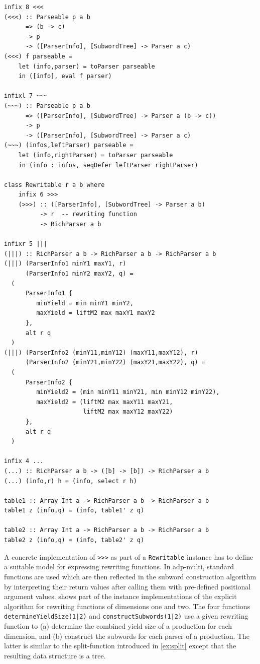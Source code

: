 \documentclass[
    a4paper,
    12pt,
    twoside,
    BCOR=12mm,
    parskip=half,
    chapterprefix,
    numbers=noenddot,
    bibliography=totoc
]{scrbook}
\begin{document}
\begin{lstlisting}[label=lst:combinators,caption=Rich combinators]
infix 8 <<<
(<<<) :: Parseable p a b 
      => (b -> c)
      -> p
      -> ([ParserInfo], [SubwordTree] -> Parser a c)
(<<<) f parseable =
    let (info,parser) = toParser parseable
    in ([info], eval f parser)
    
infixl 7 ~~~
(~~~) :: Parseable p a b 
      => ([ParserInfo], [SubwordTree] -> Parser a (b -> c))
      -> p
      -> ([ParserInfo], [SubwordTree] -> Parser a c)
(~~~) (infos,leftParser) parseable =
    let (info,rightParser) = toParser parseable
    in (info : infos, seqDefer leftParser rightParser)
    
class Rewritable r a b where
    infix 6 >>>
    (>>>) :: ([ParserInfo], [SubwordTree] -> Parser a b) 
          -> r  -- rewriting function
          -> RichParser a b
        
infixr 5 ||| 
(|||) :: RichParser a b -> RichParser a b -> RichParser a b
(|||) (ParserInfo1 minY1 maxY1, r) 
      (ParserInfo1 minY2 maxY2, q) =
  (
      ParserInfo1 {
         minYield = min minY1 minY2,
         maxYield = liftM2 max maxY1 maxY2
      },
      alt r q
  )
(|||) (ParserInfo2 (minY11,minY12) (maxY11,maxY12), r) 
      (ParserInfo2 (minY21,minY22) (maxY21,maxY22), q) = 
  (
      ParserInfo2 {
         minYield2 = (min minY11 minY21, min minY12 minY22),
         maxYield2 = (liftM2 max maxY11 maxY21, 
                      liftM2 max maxY12 maxY22)
      },
      alt r q
  )
        
infix 4 ...
(...) :: RichParser a b -> ([b] -> [b]) -> RichParser a b
(...) (info,r) h = (info, select r h)

table1 :: Array Int a -> RichParser a b -> RichParser a b
table1 z (info,q) = (info, table1' z q)

table2 :: Array Int a -> RichParser a b -> RichParser a b
table2 z (info,q) = (info, table2' z q)
\end{lstlisting}

A concrete implementation of \verb|>>>| as part of a \verb|Rewritable| instance has to define a suitable model for expressing rewriting functions. In adp-multi, standard functions are used which are then reflected in the subword construction algorithm by interpreting their return values after calling them with pre-defined positional argument values.  shows part of the instance implementations of the explicit algorithm for rewriting functions of dimensions one and two. The four functions \verb/determineYieldSize(1|2)/ and \verb/constructSubwords(1|2)/ use a given rewriting function to (a) determine the combined yield size of a production for each dimension, and (b) construct the subwords for each parser of a production. The latter is similar to the split-function introduced in \vref{ex:split} except that the resulting data structure is a tree.
\end{document}

